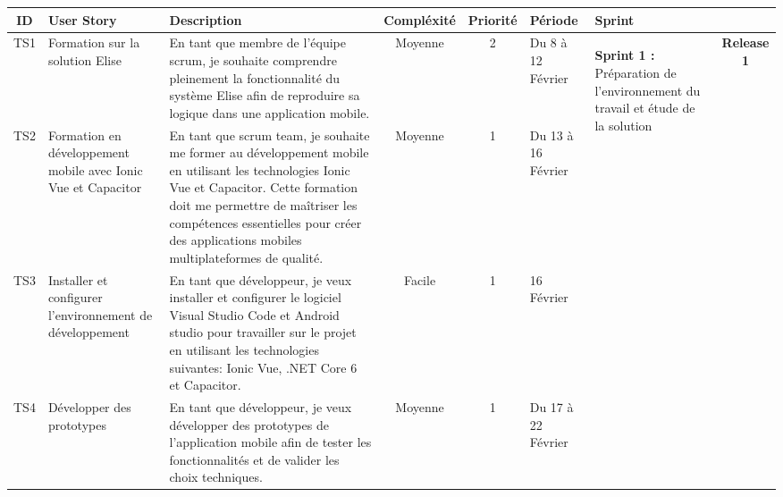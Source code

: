\newpage
\begin{landscape}



  \begin{adjustwidth}{-1cm}{}
      
      \begin{longtable}{|c|p{3cm}|p{8cm}|c|c|p{2cm}|p{2cm}|c|}
        \hline
    ID  &   User Story  &  Description   &  Compléxité  &  Priorité  &  Période  &  Sprint  &   \\
    \hline
    TS1  &  Formation sur la solution Elise  &  En tant que membre de l'équipe scrum, je souhaite comprendre pleinement la fonctionnalité du système Elise afin de reproduire sa logique dans une application mobile.   &  Moyenne  &  2  &  Du 8  à 12  Février  &  \multirow{3}{2cm}{
      \begin{center}
        
        \textbf{Sprint 1 :} Préparation de l’environnement du travail et étude de la solution
      \end{center}
      }  &  \multirow{19}{2.5cm}[-10.5ex]{\textbf{Release 1}}  \\
    \cline{1-6}
    TS2  &  Formation en développement mobile avec Ionic Vue et Capacitor  &  En tant que scrum team, je souhaite me former au développement mobile en utilisant les technologies Ionic Vue et Capacitor. Cette formation doit me permettre de maîtriser les compétences essentielles pour créer des applications mobiles multiplateformes de qualité.  &  Moyenne  &  1  &  Du 13  à 16 Février  &  &  \\
    \cline{1-6}
    TS3  &  Installer et configurer l'environnement de développement  &  En tant que développeur, je veux installer et configurer le logiciel Visual Studio Code et Android studio pour travailler sur le projet en utilisant les technologies suivantes: Ionic Vue, .NET Core 6 et Capacitor.  &  Facile  &  1  &  16 Février  &  & \\
    \cline{1-6}
    TS4  &  Développer des prototypes  &  En tant que développeur, je veux développer des prototypes de l'application mobile afin de tester les fonctionnalités et de valider les choix techniques.  &  Moyenne  &  1  &  Du 17  à 22 Février  &  & \\

    \cline{1-7}


\end{longtable}
\end{adjustwidth}
\end{landscape}
